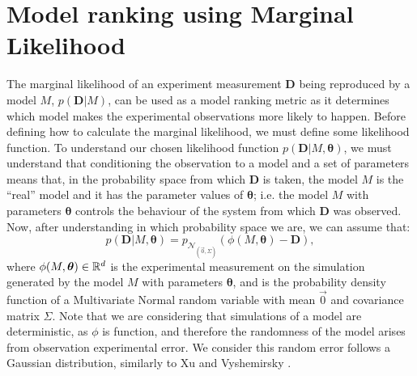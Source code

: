\section{Model ranking using Marginal Likelihood}
\label{sec:marginal_likelihood_method}
The marginal likelihood of an experiment measurement ${\bm D}$ being 
reproduced by a model $M$, $p ({\bm D} | M)$, can be used as a model
ranking metric as it determines which model makes the experimental
observations more likely to happen. Before defining how to calculate the
marginal likelihood, we must define some likelihood function. To
understand our chosen likelihood function $p ({\bm D} | M, {\bm
\theta})$, we must understand that conditioning the observation to a
model and a set of parameters means that, in the probability space from
which ${\bm D}$ is taken, the model $M$ is the ``real'' model and it has
the parameter values of ${\bm \theta}$; i.e. the model $M$ with
parameters ${\bm \theta}$ controls the behaviour of the system from
which ${\bm D}$ was observed. Now, after understanding in which
probability space we are, we can assume that: 
\begin{equation}
    p ({\bm D} | M,{\bm \theta}) = 
        p_{\mathcal{N}_{\left(\vec{0}, \Sigma\right)}}
        (\phi (M, {\bm\theta}) - {\bm D}),
\label{eq:likelihood_multivariate}
\end{equation}
where $\phi (M, {\bm \theta}) \in \mathbb{R}^d$ is the experimental 
measurement on the simulation generated by the model $M$ with parameters
${\bm \theta}$, and  is the probability density function of a Multivariate Normal 
random variable with mean $\vec{0}$ and covariance matrix $\Sigma$. Note
that we are considering that simulations of a model are deterministic,
as $\phi$ is function, and therefore the randomness of the model
arises from observation experimental error. We consider this random
error follows a Gaussian distribution, similarly to Xu and Vyshemirsky
\cite{Xura20}\cite{Vyshemirsky2007}.

